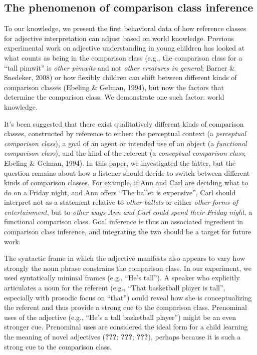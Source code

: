 \documentclass[doc]{apa6}
\begin{document}
\subsection{The phenomenon of comparison class
inference}

To our knowledge, we present the first behavioral data of how reference
classes for adjective interpretation can adjust based on world
knowledge. Previous experimental work on adjective understanding in
young children has looked at what counts as being in the comparison
class (e.g., the comparison class for a ``tall pimwit'' is \emph{other
pimwits} and not \emph{other creatures in general}; Barner \& Snedeker,
2008) or how flexibly children can shift between different kinds of
comparison classes (Ebeling \& Gelman, 1994), but now the factors that
determine the comparison class. We demonstrate one such factor: world
knowledge.

It's been suggested that there exist qualitatively different kinds of
comparison classes, constructed by reference to either: the perceptual
context (a \emph{perceptual comparison class}), a goal of an agent or
intended use of an object (a \emph{functional comparison class}), and
the kind of the referent (a \emph{conceptual comparison class}; Ebeling
\& Gelman, 1994). In this paper, we investigated the latter, but the
question remains about how a listener should decide to switch between
different kinds of comparison classes. For example, if Ann and Carl are
deciding what to do on a Friday night, and Ann offers ``The
ballet is expensive'', Carl should interpret not as a statement relative
to \emph{other ballets} or either \emph{other forms of entertainment},
but to \emph{other ways Ann and Carl could spend their Friday night}, a
functional comparison class. Goal inference is thus an associated
ingredient in comparison class inference, and integrating the two
should be a target for future work.

The syntactic frame in which the adjective manifests also appears to
vary how strongly the noun phrase constrains the comparison class. In
our experiment, we used syntatically minimal frames (e.g., ``He's
tall''). A speaker who explicitly articulates a noun for the referent
(e.g., ``That basketball player is tall'', especially with
prosodic focus on ``that'') could reveal how she is
conceptualizing the referent and thus provide a strong cue to the
comparison class. Prenominal uses of the adjective (e.g., ``He's
a tall basketball player'') might be an even stronger cue. Prenominal
uses are considered the ideal form for a child learning the meaning of
novel adjectives ({\textbf{???}}; {\textbf{???}}; {\textbf{???}}),
perhaps because it is such a strong cue to the comparison class.
\end{document}
